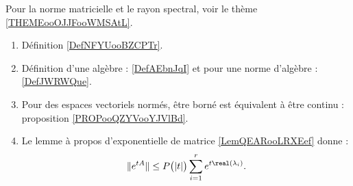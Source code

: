 
         \label{THEMEooHSLLooBQpFAr}
    Pour la norme matricielle et le rayon spectral, voir le thème \ref{THEMEooOJJFooWMSAtL}.
    \begin{enumerate}
        \item
            Définition \ref{DefNFYUooBZCPTr}.
        \item 
            Définition d'une algèbre : \ref{DefAEbnJqI} et pour une norme d'algèbre : \ref{DefJWRWQue}.
        \item
            Pour des espaces vectoriels normés, être borné est équivalent à être continu : proposition \ref{PROPooQZYVooYJVlBd}.
        \item
            Le lemme à propos d'exponentielle de matrice \ref{LemQEARooLRXEef} donne :
            \begin{equation}
                \|  e^{tA} \|\leq P\big( | t | \big)\sum_{i=1}^r e^{t\real(\lambda_i)}.
            \end{equation}
    \end{enumerate}

